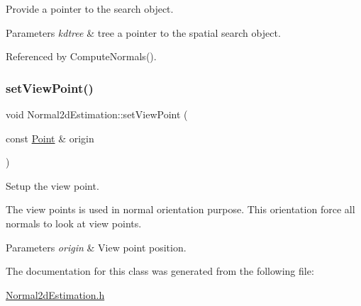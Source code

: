 Provide a pointer to the search object. 


\begin{DoxyParams}{Parameters}
{\em kdtree} & tree a pointer to the spatial search object. \\
\hline
\end{DoxyParams}


Referenced by Compute\+Normals().

\mbox{\label{classNormal2dEstimation_ad05b65f35c4aa0b1511bf81e5a70b36d}} 
\subsubsection{\texorpdfstring{set\+View\+Point()}{setViewPoint()}}
{\footnotesize\ttfamily void Normal2d\+Estimation\+::set\+View\+Point (\begin{DoxyParamCaption}\item[{const \hyperlink{Normal2dEstimation_8h_ab8d898f36957cca40634530a6f118a3e}{Point} \&}]{origin }\end{DoxyParamCaption})\hspace{0.3cm}{\ttfamily [inline]}}



Setup the view point. 

The view points is used in normal orientation purpose. This orientation force all normals to look at view points.


\begin{DoxyParams}{Parameters}
{\em origin} & View point position. \\
\hline
\end{DoxyParams}


The documentation for this class was generated from the following file\+:\begin{DoxyCompactItemize}
\item 
\hyperlink{Normal2dEstimation_8h}{Normal2d\+Estimation.\+h}\end{DoxyCompactItemize}
